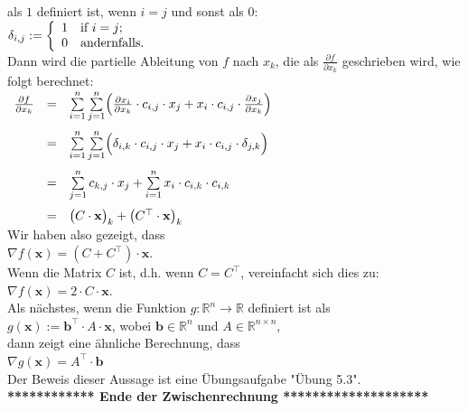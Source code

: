 \documentclass[12pt]{article}
\begin{document}
als $1$ definiert ist, wenn $i = j$ und sonst als $0$:
\\[0.2cm]
\hspace*{1.3cm}
$ \delta_{i,j} := 
\left\{{
\begin{array}[c]{ll}
  1 & \mbox{if $i = j$;} \\
  0 & \mbox{andernfalls.}
\end{array}}
\right. 
$
\\[0.2cm]
%
Dann wird die partielle Ableitung von $f$ nach $x_k$, die als $ \frac{\partial f}{\partial x_k}$ geschrieben wird, wie folgt berechnet:
\\[0.2cm]
\hspace*{1.3cm}
$
\begin{array}[t]{lcl}
 \frac{\partial f}{\partial x_k} & = &
 \sum\limits_{i=1}^n \sum\limits_{j=1}^n \Bigl(
    \frac{\partial x_i}{\partial x_k} \cdot c_{i,j} \cdot x_j + x_i \cdot c_{i,j} \cdot \frac{\partial x_j}{\partial x_k}
    \Bigr) \\[0.5cm]
& = &
 \sum\limits_{i=1}^n \sum\limits_{j=1}^n \Bigl(
    \delta_{i,k} \cdot c_{i,j} \cdot x_j + x_i \cdot c_{i,j} \cdot \delta_{j,k} \Bigr) \\[0.5cm]
& = &
 \sum\limits_{j=1}^n c_{k,j} \cdot x_j + \sum\limits_{i=1}^n x_i \cdot c_{i,k} \cdot c_{i,k} \\[0.5cm]
& = & \bigl(C \cdot \mathbf{x}\bigr)_k + \bigl(C^\top \cdot \mathbf{x}\bigr)_k
\end{array}
$
\\[0.3cm]
Wir haben also gezeigt, dass 
\\[0.3cm]
\hspace*{1.3cm}
$ \nabla f(\mathbf{x}) = (C + C^\top) \cdot \mathbf{x}$.
\\[0.2cm]
Wenn die Matrix $C$ {\color{blue}{symmetrisch}} ist, d.h. wenn $C = C^\top$, vereinfacht sich dies zu:
\\[0.2cm]
\hspace*{1.3cm}
$ \nabla f(\mathbf{x}) = 2 \cdot C \cdot \mathbf{x}$.
\\[0.5cm]
Als nächstes, wenn die Funktion $g: \mathbb{R}^n \rightarrow \mathbb{R}$ definiert ist als 
\\[0.2cm]
\hspace*{1.3cm}
$g(\mathbf{x}) := \mathbf{b}^\top \cdot A \cdot \mathbf{x}$, \quad wobei $\mathbf{b} \in \mathbb{R}^n$ und $A \in \mathbb{R}^{n \times n}$,
\\[0.2cm]
dann zeigt eine ähnliche Berechnung, dass
\\[0.2cm]
\hspace*{1.3cm}
$ \nabla g(\mathbf{x}) = A^\top \cdot \mathbf{b}$ \\[0.2cm]
Der Beweis dieser Aussage ist eine Übungsaufgabe "Übung 5.3".\\[0.2cm]
\textbf{************ Ende der Zwischenrechnung ********************}\\
\end{document}
